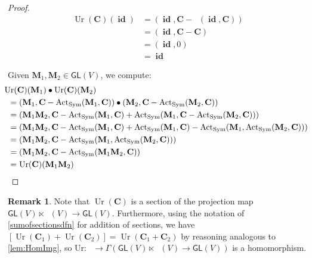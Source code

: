 \documentclass[12pt]{article}
\newcounter{counter}
\theoremstyle{definition}
\newtheorem{rmk}[counter]{Remark}
\theoremstyle{plain}
\newcommand{\Symp}{\mathop{\mathrm{Sym}_2^+}}
\newcommand{\id}{\mathop{\mathbf{id}}\nolimits}
\newcommand{\ActSym}
{\mathop{\mathrm{Act}_{\mathrm{Sym}}}}
\begin{document}
\begin{proof}
    \begin{align}
        \mathop{\mathrm{Ur}} (\mathbf{C})(\id) &= (\id, \mathbf{C} - \ActSym (\id, \mathbf{C})) \\
        &= (\id, \mathbf{C} - \mathbf{C}) \\
        &= (\id, 0) \\
        &= \id
    \end{align}

    Given \(\mathbf{M}_1, \mathbf{M}_2 \in \mathsf{GL} (V)\), we compute:
    \begin{alignat}{3}
        &\hskip -6 pt \mathop{\mathrm{Ur}} (\mathbf{C})(\mathbf{M}_1) \bullet \mathop{\mathrm{Ur}} (\mathbf{C})(\mathbf{M}_2) \\
        &= (\mathbf{M}_1, \mathbf{C} - \ActSym (\mathbf{M}_1, \mathbf{C})) \bullet (\mathbf{M}_2, \mathbf{C} - \ActSym (\mathbf{M}_2, \mathbf{C})) \\
        &= (\mathbf{M}_1 \mathbf{M}_2, \mathbf{C} - \ActSym (\mathbf{M}_1, \mathbf{C}) + \ActSym (\mathbf{M}_1, \mathbf{C} - \ActSym (\mathbf{M}_2, \mathbf{C}))) \\
        &= (\mathbf{M}_1 \mathbf{M}_2, \mathbf{C} - \ActSym (\mathbf{M}_1, \mathbf{C}) + \ActSym (\mathbf{M}_1, \mathbf{C}) - \ActSym (\mathbf{M}_1,\ActSym (\mathbf{M}_2, \mathbf{C}))) \\
        &= (\mathbf{M}_1 \mathbf{M}_2, \mathbf{C}
        - \ActSym (\mathbf{M}_1,\ActSym (\mathbf{M}_2, \mathbf{C}))) \\
        &= (\mathbf{M}_1 \mathbf{M}_2, \mathbf{C}
        - \ActSym (\mathbf{M}_1 \mathbf{M}_2, \mathbf{C})) \\
        &= \mathop{\mathrm{Ur}} (\mathbf{C})(\mathbf{M}_1 \mathbf{M}_2)
    \end{alignat}
\end{proof}

\begin{rmk}
    Note that \(\mathop{\mathrm{Ur}} (\mathbf{C})\) is a section of the projection map \(\mathsf{GL} (V) \ltimes \Symp (V) \to \mathsf{GL}(V)\).  Furthermore, using the notation of \autoref{sumofsectionsdfn} for addition of sections, we have \([\mathop{\mathrm{Ur}} (\mathbf{C}_1) + \mathop{\mathrm{Ur}} (\mathbf{C}_2)] = \mathop{\mathrm{Ur}} (\mathbf{C}_1 + \mathbf{C}_2)\) by reasoning analogous to \autoref{lem:HomImg}, so \(\mathrm{Ur} \colon \Symp \to \Gamma(\mathsf{GL} (V) \ltimes \Symp (V) \to \mathsf{GL}(V))\) is a homomorphism.\\
\end{rmk}
\end{document}
